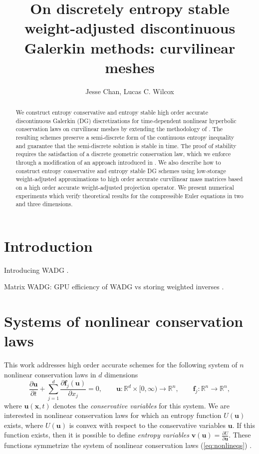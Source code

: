 \documentclass[preprint,10pt]{article}
\date{}
\author{Jesse Chan, Lucas C. Wilcox}
\title{On discretely entropy stable weight-adjusted discontinuous Galerkin methods: curvilinear meshes}%
\theoremstyle{definition}
\theoremstyle{lemma}
\theoremstyle{theorem}
\theoremstyle{assumption}
\newcommand{\pd}[2]{\frac{\partial#1}{\partial#2}}
\begin{document}
\maketitle

\begin{abstract}
We construct entropy conservative and entropy stable high order accurate discontinuous Galerkin (DG) discretizations for time-dependent nonlinear hyperbolic conservation laws on curvilinear meshes by extending the methodology of \cite{chan2017discretely}.  The resulting schemes preserve a semi-discrete form of the continuous entropy inequality and guarantee that the semi-discrete solution is stable in time.  The proof of stability requires the satisfaction of a discrete geometric conservation law, which we enforce through a modification of an approach introduced in \cite{kopriva2006metric}.  We also describe how to construct entropy conservative and entropy stable DG schemes using low-storage weight-adjusted approximations to high order accurate curvilinear mass matrices \cite{chan2016weight1, chan2016weight2} based on a high order accurate weight-adjusted projection operator.  We present numerical experiments which verify theoretical results for the compressible Euler equations in two and three dimensions.
\end{abstract}

\tableofcontents

\section{Introduction}

Introducing WADG \cite{chan2016weight1,chan2016weight2}.  

Matrix WADG: GPU efficiency of WADG vs storing weighted inverses \cite{chan2017weight}.  

\section{Systems of nonlinear conservation laws}

This work addresses high order accurate schemes for the following system of $n$ nonlinear conservation laws in $d$ dimensions 
\begin{equation}
  \pd{\bm{u}}{t} + \sum_{j=1}^d\pd{\bm{f}_j(\bm{u})}{x_j}  = 0, \qquad \bm{u} : \mathbb{R}^d \times [0,\infty) \rightarrow  \mathbb{R}^n, \qquad \bm{f}_j : \mathbb{R}^n\rightarrow \mathbb{R}^n,
\label{eq:nonlineqs}
\end{equation}
where $\bm{u}(\bm{x},t)$ denotes the \emph{conservative variables} for this system.  %
We are interested in nonlinear conservation laws for which an entropy function $U(\bm{u})$ exists, where $U(\bm{u})$ is convex with respect to the conservative variables $\bm{u}$.  If this function exists, then it is possible to define \emph{entropy variables} $\bm{v}(\bm{u}) = \pd{U}{\bm{u}}$.  These functions symmetrize the system of nonlinear conservation laws (\ref{eq:nonlineqs}) \cite{hughes1986new}.  
\end{document}
